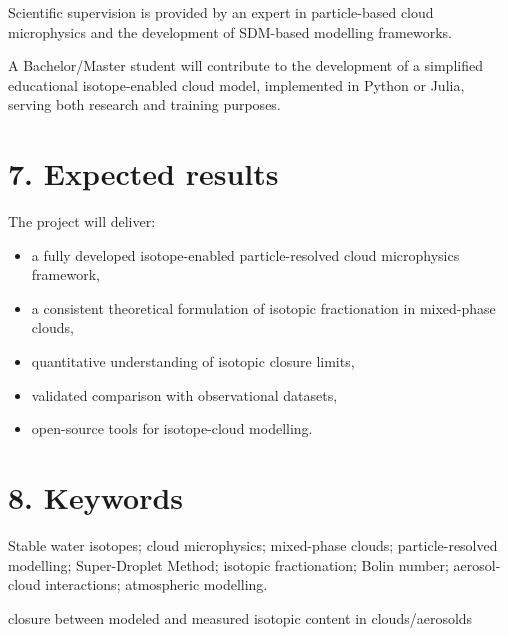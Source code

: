 \documentclass[11pt,a4paper]{article}
\begin{document}
Scientific supervision is provided by an expert in particle-based cloud microphysics and the development of SDM-based modelling frameworks.

A Bachelor/Master student will contribute to the development of a simplified educational isotope-enabled cloud model, implemented in Python or Julia, serving both research and training purposes.

\section*{7. Expected results}
The project will deliver:

\begin{itemize}
\item a fully developed isotope-enabled particle-resolved cloud microphysics framework,


\item a consistent theoretical formulation of isotopic fractionation in mixed-phase clouds,


\item quantitative understanding of isotopic closure limits,


\item validated comparison with observational datasets,


\item open-source tools for isotope-cloud modelling.


\end{itemize}
\section*{8. Keywords}
Stable water isotopes; cloud microphysics; mixed-phase clouds; particle-resolved modelling; Super-Droplet Method; isotopic fractionation; Bolin number; aerosol-cloud interactions; atmospheric modelling.




closure between modeled and measured isotopic content in clouds/aerosolds


\appendix

\clearpage
\printbibliography
\end{document}
